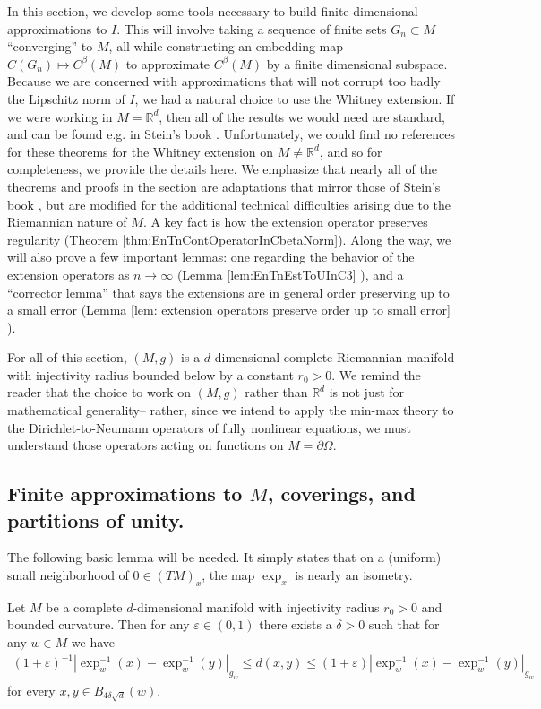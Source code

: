 \documentclass[11pt,reqno]{amsart}
\numberwithin{equation}{section}
\theoremstyle{plain}
\def\real{{\mathbb R}}
\def\Om{\Omega}
\begin{document}
In this section, we develop some tools necessary to build finite dimensional approximations to $I$.  This will involve taking a sequence of finite sets $G_n \subset M$ ``converging'' to $M$, all while constructing an embedding map $C(G_n) \mapsto C^\beta(M)$ to approximate $C^\beta(M)$ by a finite dimensional subspace. Because we are concerned with approximations that will not corrupt too badly the Lipschitz norm of $I$, we had a natural choice to use the Whitney extension.  If we were working in $M=\real^d$, then all of the results we would need are standard, and can be found e.g. in Stein's book \cite[Chapter 6]{Stei-71}.  Unfortunately, we could find no references for these theorems for the Whitney extension on $M\not=\real^d$, and so for completeness, we provide the details here.  We emphasize that nearly all of the theorems and proofs in the section are adaptations that mirror those of Stein's book \cite{Stei-71}, but are modified for the additional technical difficulties arising due to the Riemannian nature of $M$. A key fact is how the extension operator preserves regularity (Theorem \ref{thm:EnTnContOperatorInCbetaNorm}). Along the way, we will also prove a few important lemmas: one regarding the behavior of the extension operators as $n\to\infty$ (Lemma \ref{lem:EnTnEstToUInC3} ), and a  ``corrector lemma'' that says the extensions are in general order preserving up to a small error (Lemma \ref{lem: extension operators preserve order up to small error} ).

For all of this section, $(M,g)$ is a $d$-dimensional complete Riemannian manifold with injectivity radius bounded below by a constant $r_0>0$.  We remind the reader that the choice to work on $(M,g)$ rather than $\real^d$ is not just for mathematical generality-- rather, since we intend to apply the min-max theory to the Dirichlet-to-Neumann operators of fully nonlinear equations, we must understand those operators acting on functions on $M=\partial\Om$. 


\subsection{Finite approximations to $M$, coverings, and partitions of unity.} The following basic lemma will be needed.  It simply states that on a (uniform) small neighborhood of $0 \in (TM)_x$, the map $\exp_x$ is nearly an isometry.

\begin{lem}\label{lem: injectivity radius}
  Let $M$ be a complete $d$-dimensional manifold with injectivity radius $r_0>0$ and bounded curvature. Then for any $\varepsilon \in (0,1)$ there exists a $\delta>0$ such that for any $w\in M$ we have
  \begin{align*}	
    (1+\varepsilon)^{-1}| \exp_{w}^{-1}(x)-\exp_{w}^{-1}(y)|_{g_{w}} \leq d(x,y) \leq (1+\varepsilon)| \exp_{w}^{-1}(x)-\exp_{w}^{-1}(y)|_{g_{w}}
  \end{align*}	   
  for every $x,y \in B_{4\delta\sqrt{d}}(w)$.   
\end{lem}
\end{document}
